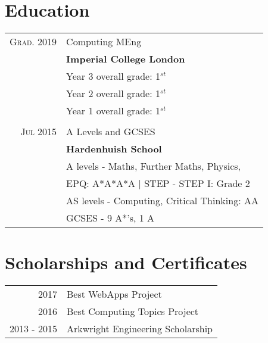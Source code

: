 \documentclass[a4paper,10pt]{article} %
\begin{document}
\begin{multicols}{2}
\section{Education}

\begin{tabular}{rl}	
\textsc{Grad. 2019} & Computing MEng\\
& \textbf{Imperial College London}\\
& \footnotesize{Year 3 overall grade: 1$^{st}$} \\
& \footnotesize{Year 2 overall grade: 1$^{st}$} \\
& \footnotesize{Year 1 overall grade: 1$^{st}$} \\
& \\


\textsc{Jul 2015} & A Levels and GCSES \\
& \textbf{Hardenhuish School} \\
& \footnotesize{A levels - Maths, Further Maths, Physics,} \\
& \footnotesize{EPQ: A*A*A*A  | STEP - STEP I: Grade 2 }\\
& \footnotesize{AS levels - Computing, Critical Thinking: AA}\\
& \footnotesize{GCSES - 9 A*'s, 1 A}


\end{tabular}

\section{Scholarships and Certificates}

\begin{tabular}{rl}
\textsc{2017} & Best WebApps Project \\
\textsc{2016} & Best Computing Topics Project \\
\textsc{2013 - 2015} & Arkwright Engineering Scholarship \\
\end{tabular}


\end{multicols}
\end{document}
